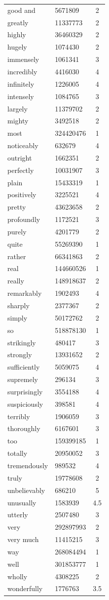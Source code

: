\documentclass[10pt,letterpaper]{article}
\begin{document}
\begin{table}[ht]
\begin{center}
\begin{tabular}{llc}
good and & 5671809 & 2 \\
greatly & 11337773 & 2 \\
highly & 36460329 & 2 \\
hugely & 1074430 & 2 \\
immensely & 1061341 & 3 \\
incredibly & 4416030 & 4 \\
infinitely & 1226005 & 4 \\
intensely & 1084765 & 3 \\
largely & 11379702 & 2 \\
mighty & 3492518 & 2 \\
most & 324420476 & 1 \\
noticeably & 632679 & 4 \\
outright & 1662351 & 2 \\
perfectly & 10031907 & 3 \\
plain & 15433319 & 1 \\
positively & 3225521 & 4 \\
pretty & 43623658 & 2 \\
profoundly & 1172521 & 3 \\
purely & 4201779 & 2 \\
quite & 55269390 & 1 \\
rather & 66341863 & 2 \\
real & 144660526 & 1 \\
really & 148918637 & 2 \\
remarkably & 1902493 & 4 \\
sharply & 2377367 & 2 \\
simply & 50172762 & 2 \\
so & 518878130 & 1 \\
strikingly & 480417 & 3 \\
strongly & 13931652 & 2 \\
sufficiently & 5059075 & 4 \\
supremely & 296134 & 3 \\
surprisingly & 3554188 & 4 \\
suspiciously & 398581 & 4 \\
terribly & 1906059 & 3 \\
thoroughly & 6167601 & 3 \\
too & 159399185 & 1 \\
totally & 20950052 & 3 \\
tremendously & 989532 & 4 \\
truly & 19778608 & 2 \\
unbelievably & 686210 & 5 \\
unusually & 1583939 & 4.5 \\
utterly & 2507480 & 3 \\
very & 292897993 & 2 \\
very much & 11415215 & 3 \\
way & 268084494 & 1 \\
well & 301853777 & 1 \\
wholly & 4308225 & 2 \\
wonderfully & 1776763 & 3.5
  \end{tabular}
 \end{center}
\end{table}
\end{document}
